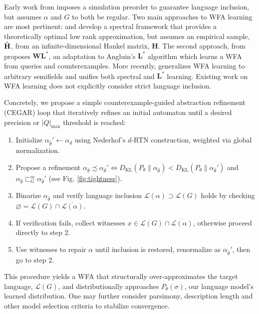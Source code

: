 \documentclass[usletter,11pt]{article}
\begin{document}
Early work from \cite{dill1991checking} imposes a simulation preorder to guarantee language inclusion, but assumes $\alpha$ and $G$ to both be regular. Two main approaches to WFA learning are most pertinent: \cite{bailly2009grammatical} and \cite{balle2014spectral} develop a spectral framework that provides a theoretically optimal low rank approximation, but assumes an empirical sample, $\Hat{\mathbf{H}}$, from an infinite-dimensional Hankel matrix, $\mathbf{H}$. The second approach, from \cite{weiss2019learning} proposes $\textbf{WL}^*$, an adaptation to Angluin's $\textbf{L}^*$ algorithm which learns a WFA from queries and counterexamples. More recently, \cite{pasti2024algorithm} generalizes WFA learning to arbitrary semifields and unifies both spectral and $\textbf{L}^*$ learning. Existing work on WFA learning does not explicitly consider strict language inclusion.

Concretely, we propose a simple counterexample-guided abstraction refinement (CEGAR) loop that iteratively refines an initial automaton until a desired precision or $|Q|_\max$ threshold is reached:

\begin{enumerate}
  \itemsep0em
  \item Initialize $\alpha_{\hat\theta}'\leftarrow \alpha_d$ using Nederhof's $d$-RTN construction, weighted via global normalization.
  \item Propose a refinement $\alpha_{\hat\theta} \precsim \alpha_{\hat\theta}' \iff D_\text{KL}(P_{\theta}\|\alpha_{\hat\theta}) < D_\text{KL}(P_{\theta}\|\alpha_{\hat\theta}')$ and $\alpha_{\hat\theta} \sqsubset_G^m \alpha_{\hat\theta}'$ (see Fig. \ref{fig:tightness}).
  \item Binarize $\alpha_\hat\theta$ and verify language inclusion $\mathcal{L}(\alpha) \supset \mathcal{L}(G)$ holds by checking $\varnothing =\mathcal{L}(G)\cap \overline{\mathcal{L}(\alpha)}$.
  \item If verification fails, collect witnesses $x \in \mathcal{L}(G)\cap \overline{\mathcal{L}(\alpha)}$, otherwise proceed directly to step 2.
  \item Use witnesses to repair $\alpha$ until inclusion is restored, renormalize as $\alpha_{\hat\theta}'$, then go to step 2.
\end{enumerate}

\noindent This procedure yields a WFA that structurally over-approximates the target language, $\mathcal{L}(G)$, and distributionally approaches $P_{\theta}(\sigma)$, our language model's learned distribution. One may further consider parsimony, description length and other model selection criteria to stabilize convergence.
\end{document}
